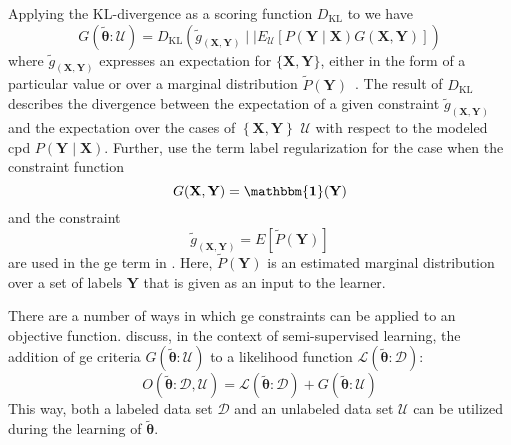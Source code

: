 Applying the $\text{KL}$-divergence as a scoring function $D_{\text{KL}}$ to  we have~\citep{mann2010generalized}
\begin{equation}
  \label{equ:generalized-expectation-kl}
  G(\mathbf{\tilde{\theta}}:\mathcal{U})=D_{\text{KL}}\left(\tilde{g}_{\left(\mathbf{X},\mathbf{Y}\right)}\mid\mid E_{\mathcal{U}}\left[P(\mathbf{Y}\mid\mathbf{X})G(\mathbf{X},\mathbf{Y})\right]\right)
\end{equation}
where $\tilde{g}_{\left(\mathbf{X},\mathbf{Y}\right)}$ expresses an expectation for $\{\mathbf{X},\mathbf{Y}\}$, either in the form of a particular value or over a \gls{marginal distribution} $\tilde{P}\left(\mathbf{Y}\right)$~\citep{mann2010generalized}.
The result of $D_{\text{KL}}$ describes the divergence between the expectation of a given constraint $\tilde{g}_{\left(\mathbf{X},\mathbf{Y}\right)}$ and the expectation over the cases of $\left\{\mathbf{X},\mathbf{Y}\right\}$ $\mathcal{U}$ with respect to the modeled \gls{cpd} $P(\mathbf{Y}\mid\mathbf{X})$.
Further, \citet{mann2010generalized} use the term \gls{label regularization} for the case when the constraint function
\begin{equation}
  \label{equ:label-regularization-constraint-function}
  G(\mathbf{X},\mathbf{Y})=\mathbf{\mathbbm{1}}(\mathbf{Y})
\end{equation}
and the constraint
\begin{equation}
  \label{equ:label-regularization-constraints}
  \tilde{g}_{\left(\mathbf{X},\mathbf{Y}\right)}=E[\tilde{P}(\mathbf{Y})]
\end{equation}
are used in the \gls{ge} term in .
Here, $\tilde{P}(\mathbf{Y})$ is an estimated \gls{marginal distribution} over a set of labels $\mathbf{Y}$ that is given as an input to the learner.

\bigskip

There are a number of ways in which \gls{ge} constraints can be applied to an \gls{objective function}.
\citet{mann2010generalized} discuss, in the context of semi-supervised learning, the addition of \gls{ge} criteria $G(\mathbf{\tilde{\theta}}:\mathcal{U})$ to a likelihood function $\mathcal{L}(\mathbf{\tilde{\theta}}:\mathcal{D})$:
\begin{equation}
  \label{equ:objective-function-l-g}
  O(\mathbf{\tilde{\theta}}:\mathcal{D},\mathcal{U})=\mathcal{L}(\mathbf{\tilde{\theta}}:\mathcal{D})+G(\mathbf{\tilde{\theta}}:\mathcal{U})
\end{equation}
This way, both a labeled data set $\mathcal{D}$ and an unlabeled data set $\mathcal{U}$ can be utilized during the learning of $\mathbf{\tilde{\theta}}$.

